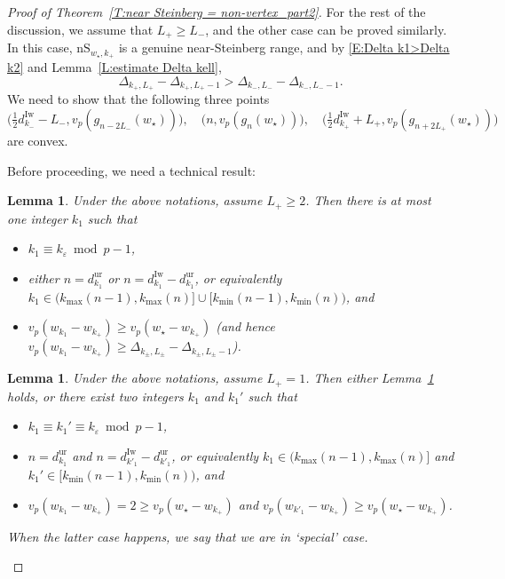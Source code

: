 \documentclass[12pt]{amsart}
\newtheorem{lemma}[subsection]{Lemma}
\theoremstyle{definition}
\numberwithin{equation}{subsection}
\newcommand{\Iw}{\mathrm{Iw}}
\newcommand{\unr}{\mathrm{ur}}
\newcommand{\nS}{\mathrm{nS}}
\begin{document}
\begin{proof}[Proof of Theorem~\ref{T:near Steinberg = non-vertex_part2}]
For the rest of the discussion, we assume that $L_+ \geq L_-$, and the other case can be proved similarly. In this case, $\nS_{w_\star, k_+}$ is a genuine near-Steinberg range, and by  \eqref{E:Delta k1>Delta k2} and Lemma~\ref{L:estimate Delta kell}, 
\[
\Delta_{k_+, L_+} - \Delta_{k_+, L_+-1} > \Delta_{k_-, L_-} - \Delta_{k_-, L_--1}.
\]
We need to show that the following three points 
\begin{equation}
\label{E:three points convex}
\big( \tfrac 12d_{k_-}^\Iw - L_-, v_p(g_{n-2L_-}(w_\star))\big), \quad \big( n, v_p(g_{n}(w_\star))\big), \quad \big( \tfrac 12d_{k_+}^\Iw + L_+, v_p(g_{n+2L_+}(w_\star))\big)
\end{equation}
are convex. 

Before proceeding, we need a technical result: 


\begin{lemma}\label{L:a technical lemma in the proof of statements (c)(d)_part1}
Under the above notations, assume $L_+\geq 2$. Then there is at most one integer $k_1$ such that
\begin{itemize}
\item $k_1 \equiv k_\varepsilon \bmod p-1$,
\item either $n = d_{k_1}^\unr $ or $n = d_{k_1}^\Iw - d_{k_1}^\unr$, or equivalently $k_{1} \in \big( k_{\max}(n-1), k_{\max}(n)\big] \cup \big[ k_{\min}(n-1), k_{\min}(n)\big)$,
and
\item $v_p(w_{k_1} - w_{k_+}) \geq v_p(w_\star - w_{k_+})$ (and hence $v_p(w_{k_1} - w_{k_+}) \geq \Delta_{k_\pm, L_\pm}-\Delta_{k_\pm,L_\pm -1}$). 
\end{itemize}
\end{lemma}

\begin{lemma}\label{L:a technical lemma in the proof of statements (c)(d)_part2}
Under the above notations, assume $L_+=1$. Then either Lemma~\ref{L:a technical lemma in the proof of statements (c)(d)_part1} holds, or there exist two integers $k_1$ and $k_1'$ such that
\begin{itemize}
\item $k_1 \equiv k_1'\equiv k_\varepsilon \bmod p-1$,
\item $n = d_{k_1}^\unr $ and $n = d_{k'_1}^\Iw - d_{k'_1}^\unr$, or equivalently $k_{1} \in \big( k_{\max}(n-1), k_{\max}(n)\big] $ and $k_1'\in \big[ k_{\min}(n-1), k_{\min}(n)\big)$,
and
\item $v_p(w_{k_1} - w_{k_+}) =2\geq v_p(w_\star - w_{k_+})$ and $v_p(w_{k'_1} - w_{k_+}) \geq v_p(w_\star - w_{k_+})$.
\end{itemize}
When the latter case happens, we say that we are in `special' case.
\end{lemma}


\end{proof}
\end{document}
